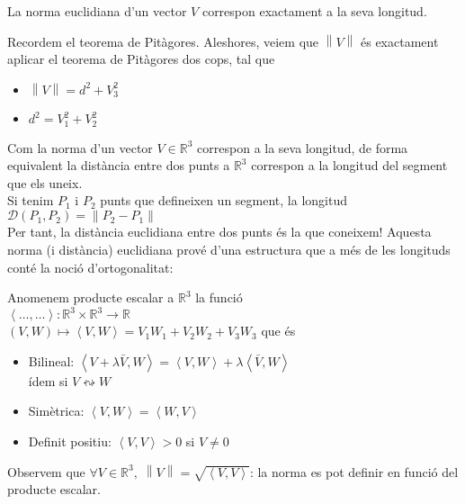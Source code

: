 \documentclass[../main.tex]{subfiles}
\begin{document}
\begin{obs}
    La norma euclidiana d'un vector $V$ correspon exactament a la seva longitud.
\end{obs}
\begin{demostracio}
    Recordem el teorema de Pitàgores. Aleshores, veiem que $\left\lVert V\right\rVert$ és exactament
    aplicar el teorema de Pitàgores dos cops, tal que
    \begin{itemize}
        \item $\left\lVert V\right\rVert = d^2 + V_3^2$
        \item $d^2 = V_1^2+V_2^2$
    \end{itemize}
\end{demostracio}
Com la norma d'un vector $V \in \mathbb{R}^3$ correspon a la seva longitud, de forma equivalent la
distància entre dos punts a $\mathbb{R}^3$ correspon a la longitud del segment que els uneix.\\
Si tenim $P_1\text{ i }P_2$ punts que defineixen un segment, la longitud $\mathcal{D}\left(P_1, P_2\right) = \left\lVert P_2-P_1\right\rVert$\\
Per tant, la distància euclidiana entre dos punts és la que coneixem!
Aquesta norma (i distància) euclidiana prové d'una estructura que a més de les longituds conté la
noció d'ortogonalitat:
\begin{definicio}
    Anomenem producte escalar a $\mathbb{R}^3$ la funció\\
    $\left\langle\dots, \dots\right\rangle: \mathbb{R}^3 \times \mathbb{R}^3 \to \mathbb{R}$\\
    $\left(V, W\right) \mapsto \left\langle V, W\right\rangle = V_1W_1 + V_2W_2 + V_3W_3$
    que és
    \begin{itemize}
        \item Bilineal: $\left\langle V+\lambda \bar{V}, W\right\rangle = \left\langle V, W\right\rangle + \lambda\left\langle \bar{V}, W\right\rangle$
        \\ ídem si $V \leftrightsquigarrow W$
        \item Simètrica: $\left\langle V, W\right\rangle = \left\langle W, V\right\rangle$
        \item Definit positiu: $\left\langle V, V\right\rangle > 0$ si $V \neq 0$
    \end{itemize}
\end{definicio}
Observem que $\forall V \in \mathbb{R}^3,\;\left\lVert V\right\rVert = \sqrt{\left\langle V, V\right\rangle}$:
la norma es pot definir en funció del producte escalar.\\
\end{document}
